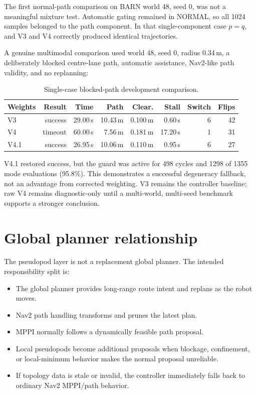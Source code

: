 \documentclass[11pt,a4paper]{article}
\begin{document}
The first normal-path comparison on BARN world 48, seed 0, was not a meaningful
mixture test. Automatic gating remained in NORMAL, so all 1024 samples belonged
to the path component. In that single-component case $p=q$, and V3 and V4
correctly produced identical trajectories.

A genuine multimodal comparison used world 48, seed 0, radius 0.34\,m, a
deliberately blocked centre-lane path, automatic assistance, Nav2-like path
validity, and no replanning:

\begin{table}[h]
\centering
\begin{tabular}{lrrrrrrr}
\toprule
\textbf{Weights} & \textbf{Result} & \textbf{Time} & \textbf{Path} &
\textbf{Clear.} & \textbf{Stall} & \textbf{Switch} & \textbf{Flips} \\
\midrule
V3 & success & 29.00\,s & 10.43\,m & 0.100\,m & 0.60\,s & 6 & 42 \\
V4 & timeout & 60.00\,s & 7.56\,m & 0.181\,m & 17.20\,s & 1 & 31 \\
V4.1 & success & 26.95\,s & 10.06\,m & 0.110\,m & 0.95\,s & 6 & 27 \\
\bottomrule
\end{tabular}
\caption{Single-case blocked-path development comparison.}
\label{tab:v41blocked}
\end{table}

V4.1 restored success, but the guard was active for 498 cycles and 1298 of
1355 mode evaluations (95.8\%). This demonstrates a successful degeneracy
fallback, not an advantage from corrected weighting. V3 remains the controller
baseline; raw V4 remains diagnostic-only until a multi-world, multi-seed
benchmark supports a stronger conclusion.

\section{Global planner relationship}

The pseudopod layer is not a replacement global planner. The intended
responsibility split is:

\begin{itemize}[leftmargin=*]
  \item The global planner provides long-range route intent and replans as the
  robot moves.
  \item Nav2 path handling transforms and prunes the latest plan.
  \item MPPI normally follows a dynamically feasible path proposal.
  \item Local pseudopods become additional proposals when blockage,
  confinement, or local-minimum behavior makes the normal proposal unreliable.
  \item If topology data is stale or invalid, the controller immediately falls
  back to ordinary Nav2 MPPI/path behavior.
\end{itemize}
\end{document}
